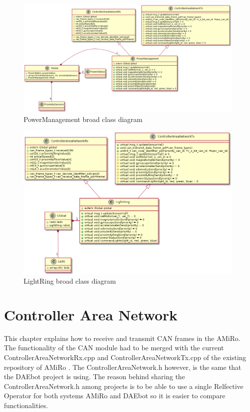 \documentclass[12pt]{report}%
\begin{document}
\begin{figure}[ht]
	\centering
	\includegraphics[width=\textwidth]{PMclass}
    \caption{PowerManagement broad class diagram}
    \label{fig:PMclass}
\end{figure}

\begin{figure}[ht]
	\centering
	\includegraphics[width=\textwidth]{LRclass}
    \caption{LightRing broad class diagram}
    \label{fig:LRclass}
\end{figure}

\chapter{Controller Area Network}
\label{chap:CAN}
This chapter explains how to receive and transmit CAN frames in the AMiRo. The functionality of the CAN module had to be merged with the current ControllerAreaNetworkRx.cpp and ControllerAreaNetworkTx.cpp of the existing repository of AMiRo \cite{AMiRo_Wiki}. The ControllerAreaNetwork.h however, is the same that the DAEbot project is using. The reason behind sharing the ControllerAreaNetwork.h among projects is to be able to use a single Relfective Operator for both systems AMiRo and DAEbot so it is easier to compare functionalities.
\end{document}
